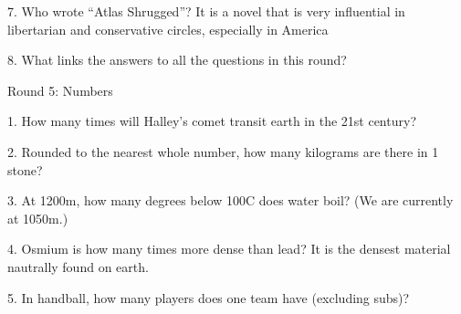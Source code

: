 \begin{frame}
\begin{center}
\Large
7. Who wrote ``Atlas Shrugged''? It is a novel that is very influential in libertarian and conservative circles, especially in America
\\
\end{center}
\end{frame}
\begin{frame}
\begin{center}
\Large
8. What links the answers to all the questions in this round?
\\
\end{center}
\end{frame}
\begin{frame}
\begin{center}
\Huge
Round 5: Numbers
\end{center}
\end{frame}
\begin{frame}
\begin{center}
\Large
1. How many times will Halley's comet transit earth in the 21st century?
\end{center}
\end{frame}
\begin{frame}
\begin{center}
\Large
2. Rounded to the nearest whole number, how many kilograms are there in 1 stone?
\end{center}
\end{frame}
\begin{frame}
\begin{center}
\Large
3. At 1200m, how many degrees below 100\textdegree C does water boil? (We are currently at 1050m.)
\end{center}
\end{frame}
\begin{frame}
\begin{center}
\Large
4. Osmium is how many times more dense than lead? It is the densest material nautrally found on earth.
\end{center}
\end{frame}
\begin{frame}
\begin{center}
\Large
5. In handball, how many players does one team have (excluding subs)?
\end{center}
\end{frame}
